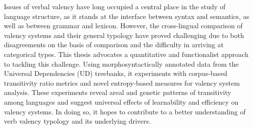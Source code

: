 
Issues of verbal valency have long occupied a central place in the study of language structure, as it stands at the interface between syntax and semantics, as well as between grammar and lexicon. However, the cross-lingual comparison of valency systems and their general typology have proved challenging due to both disagreements on the basis of comparison and the difficulty in arriving at categorical types. This thesis advocates a quantitative and functionalist approach to tackling this challenge. Using morphosyntactically annotated data from the Universal Dependencies (UD) treebanks, it experiments with corpus-based transitivity ratio metrics and novel entropy-based measures for valency system analysis. These experiments reveal areal and genetic patterns of transitivity among languages and suggest universal effects of learnability and efficiency on valency systems. In doing so, it hopes to contribute to a better understanding of verb valency typology and its underlying drivers.